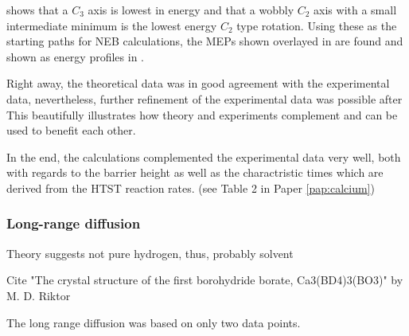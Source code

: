  shows that a $C_3$ axis is lowest in energy and that a wobbly $C_2$ axis with a small intermediate minimum is the lowest energy $C_2$ type rotation.
Using these as the starting paths for NEB calculations, the MEPs shown overlayed in  are found and shown as energy profiles in .

Right away, the theoretical data was in good agreement with the experimental data, nevertheless, further refinement of the experimental data was possible after \expand
This beautifully illustrates how theory and experiments complement and can be used to benefit each other.

In the end, the calculations complemented the experimental data very well, both with regards to the barrier height as well as the charactristic times which are derived from the HTST reaction rates. (see Table 2 in Paper \ref{pap:calcium})

\subsubsection{Long-range diffusion \pending}

\bit
\item Theory suggests not pure hydrogen, thus, probably solvent
\item Cite "The crystal structure of the first borohydride borate, Ca3(BD4)3(BO3)" by M. D. Riktor
\eit

The long range diffusion was based on only two data points.

\incomplete

